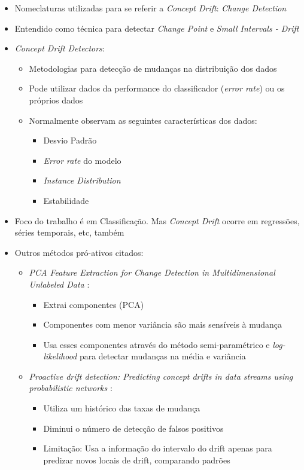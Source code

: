 \documentclass[qual, classic, a4paper]{ufbathesis}
\begin{document}
\begin{itemize}
    \item Nomeclaturas utilizadas para se referir a \textit{Concept Drift}: \textit{Change Detection}
    \item Entendido como técnica para detectar \textit{Change Point}  e \textit{Small Intervals - Drift}
    \item \textit{Concept Drift Detectors}:
    \begin{itemize}
        \item Metodologias para detecção de mudanças na distribuição dos dados
        \item Pode utilizar dados da performance do classificador (\textit{error rate}) ou os próprios dados
        \item Normalmente observam as seguintes características dos dados:
        \begin{itemize}
            \item Desvio Padrão
            \item \textit{Error rate} do modelo
            \item \textit{Instance Distribution}
            \item Estabilidade
        \end{itemize}
    \end{itemize}

    \item Foco do trabalho é em Classificação. Mas \textit{Concept Drift} ocorre em regressões, séries temporais, etc, também
    \item Outros métodos pró-ativos citados:
    \begin{itemize}
        \item \textit{PCA Feature Extraction for Change Detection in Multidimensional Unlabeled Data} \cite{PCAFeatureExtractionChangeDetection}: 
        \begin{itemize}
            \item Extrai componentes (PCA)
            \item Componentes com menor variância são mais sensíveis à mudança
            \item Usa esses componentes através do método semi-paramétrico e \textit{log-likelihood} para detectar mudanças na média e variância
        \end{itemize}

        \item \textit{Proactive drift detection: Predicting concept drifts in data streams using probabilistic networks} \cite{ProactiveDriftDetectionProbabilistic}: 
        \begin{itemize}
            \item Utiliza um histórico das taxas de mudança
            \item Diminui o número de detecção de falsos positivos
            \item Limitação: Usa a informação do intervalo do drift apenas para predizar novos locais de drift, comparando padrões
        \end{itemize}
    \end{itemize}


\end{itemize}
\end{document}
